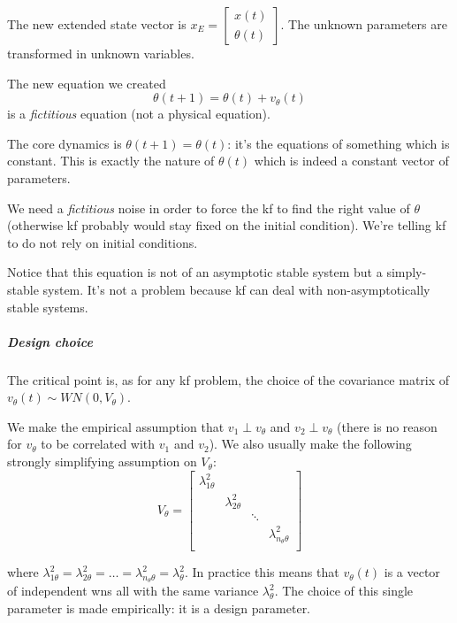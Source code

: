 The new extended state vector is $x_E = \begin{bmatrix} x(t) \\ \theta(t) \end{bmatrix}$.
The unknown parameters are transformed in unknown variables.

\begin{remark}
    The new equation we created
    \[
        \theta(t+1) = \theta(t) + v_\theta(t)
    \]
    is a \emph{fictitious} equation (not a physical equation).

    The core dynamics is $\theta(t+1)=\theta(t)$: it's the equations of something which is constant.
    This is exactly the nature of $\theta(t)$ which is indeed a constant vector of parameters.

    We need a \emph{fictitious} noise in order to force the \acrlong{kf} to find the right value of $\theta$ (otherwise \gls{kf} probably would stay fixed on the initial condition).
    We're telling \gls{kf} to do not rely on initial conditions.

    Notice that this equation is not of an asymptotic stable system but a simply-stable system.
    It's not a problem because \gls{kf} can deal with non-asymptotically stable systems.
\end{remark}

\subparagraph{Design choice} The critical point is, as for any \gls{kf} problem, the choice of the covariance matrix of $v_\theta(t) \sim WN(0, V_\theta)$. 

We make the empirical assumption that $v_1 \perp v_\theta$ and $v_2 \perp v_\theta$ (there is no reason for $v_\theta$ to be correlated with $v_1$ and $v_2$).
We also usually make the following strongly simplifying assumption on $V_\theta$: 
\[
    V_\theta = \begin{bmatrix}
        \lambda_{1\theta}^2 & & & \\
        & \lambda_{2\theta}^2 & & \\
        & & \ddots & \\
        & & & \lambda_{n_\theta\theta}^2\\
    \end{bmatrix}
\]

where $\lambda_{1\theta}^2=\lambda_{2\theta}^2=\dots=\lambda_{n_\theta\theta}^2 = \lambda_{\theta}^2$.
In practice this means that $v_\theta(t)$ is a vector of independent \gls{wn}s all with the same variance $\lambda_\theta^2$.
The choice of this single parameter is made empirically: it is a design parameter. 

